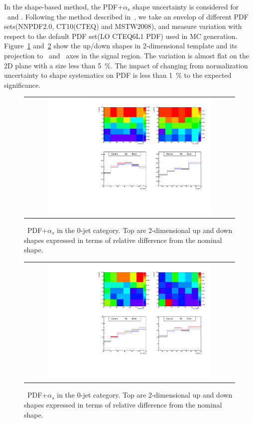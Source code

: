 In the shape-based method, the PDF+$\alpha_s$ shape uncertainty 
is considered for \qqww\ and \ggww.  
Following the method described in~\cite{pdfAN}, we take an envelop of different PDF 
sets(NNPDF2.0, CT10(CTEQ) and MSTW2008), and measure variation with respect to the default 
PDF set(LO CTEQ6L1 PDF) used in MC generation. 
Figure~\ref{fig:alter_pdfqqww} and~\ref{fig:alter_pdfggww} show the up/down 
shapes in 2-dimensional template and its projection to \mT\ and \mll\ axes
in the signal region. 
The variation is almost flat on the 2D plane with a size less than 5~\%. 
The impact of changing from normalization uncertainty to shape systematics on PDF 
is less than 1~\% to the expected significance.
%
\begin{figure}[htp] 
\centering 
\begin{tabular}{c} 
\includegraphics[width=0.8\textwidth]{figures/histo_qqWW_CMS_hww_PDFqqWW_0j_zoom.pdf} 
\end{tabular} 
\caption{ \qqww\ PDF+$\alpha_s$ in the 0-jet category. 
         Top are 2-dimensional up and down shapes expressed in terms of relative 
         difference from the nominal shape.}
\label{fig:alter_pdfqqww} 
\end{figure} 
%
\begin{figure}[htp] 
\centering 
\begin{tabular}{c} 
\includegraphics[width=0.8\textwidth]{figures/histo_ggWW_CMS_hww_PDFggWW_0j_zoom.pdf} 
\end{tabular} 
\caption{ \ggww\ PDF+$\alpha_s$ in the 0-jet category.
         Top are 2-dimensional up and down shapes expressed in terms of relative 
         difference from the nominal shape.}
\label{fig:alter_pdfggww} 
\end{figure} 


